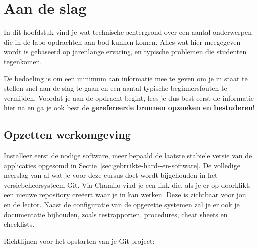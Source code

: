 \chapter{Aan de slag}
\label{ch:aan-de-slag}

In dit hoofdstuk vind je wat technische achtergrond over een aantal onderwerpen die in de labo-opdrachten aan bod kunnen komen. Alles wat hier meegegeven wordt is gebaseerd op jarenlange ervaring, en typische problemen die studenten tegenkomen.

De bedoeling is om een minimum aan informatie mee te geven om je in staat te stellen snel aan de slag te gaan en een aantal typische beginnersfouten te vermijden. Voordat je aan de opdracht begint, lees je dus best eerst de informatie hier na en ga je ook best de \textbf{gerefereerde bronnen opzoeken en bestuderen}!

\section{Opzetten werkomgeving}
\label{sec:opzetten_werkomgeving}

Installeer eerst de nodige software, meer bepaald de laatste stabiele versie van de applicaties opgesomd in Sectie~\ref{sec:gebruikte-hard--en-software}. De volledige neerslag van al wat je voor deze cursus doet wordt bijgehouden in het versiebeheersysteem Git. Via Chamilo vind je een link die, als je er op doorklikt, een nieuwe repository creëert waar je in kan werken. Deze is zichtbaar voor jou en de lector. Naast de configuratie van de opgezette systemen zal je er ook je documentatie bijhouden, zoals testrapporten, procedures, cheat sheets en checklists.

Richtlijnen voor het opstarten van je Git project:

